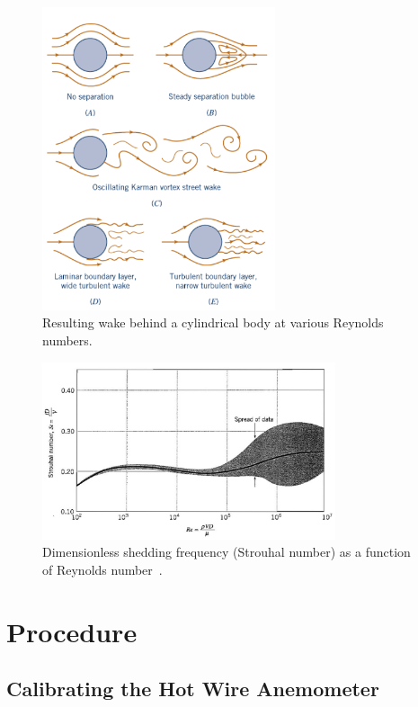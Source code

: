 \documentclass[journal,letterpaper]{IEEEtran}
\begin{document}
\begin{figure}[H]
    \centering
    \includegraphics[width=2.7in]{wake}
    \caption{Resulting wake behind a cylindrical body at various Reynolds numbers.}
    \label{fig:wake}
\end{figure}
\begin{figure}[H]
    \centering
    \includegraphics[width=3.4in]{Strouhal}
    \caption{Dimensionless shedding frequency (Strouhal number) as a function of Reynolds number~\cite{StrouhalPlot}.}
    \label{fig:strouhal}
\end{figure}

\section{Procedure}

\subsection{Calibrating the Hot Wire Anemometer}
\end{document}
